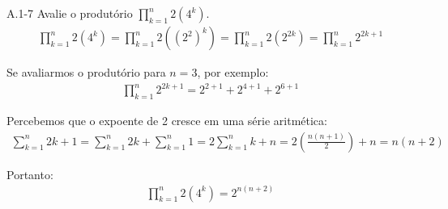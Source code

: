 
\noindent A.1-7 Avalie o produtório $\prod_{k=1}^n 2(4^k)$.\\[6pt]
\begin{align*}
\prod_{k=1}^n 2(4^k) = \prod_{k=1}^n 2({(2^2)}^k) = \prod_{k=1}^n 2(2^{2k}) = \prod_{k=1}^n 2^{2k + 1}
\end{align*}

Se avaliarmos o produtório para $n = 3$, por exemplo:
\begin{align*}
\prod_{k=1}^n 2^{2k + 1} = 2^{2 + 1} + 2^{4 + 1} + 2^{6 + 1}
\end{align*}

Percebemos que o expoente de 2 cresce em uma série aritmética:
\begin{align*}
\sum_{k=1}^n 2k + 1 = \sum_{k=1}^n 2k + \sum_{k=1}^n 1 = 2\sum_{k=1}^n k + n =
2(\frac{n(n + 1)}{2}) + n = n(n + 2)
\end{align*}

Portanto:
\begin{align*}
\prod_{k=1}^n 2(4^k) = 2^{n(n + 2)}
\end{align*}